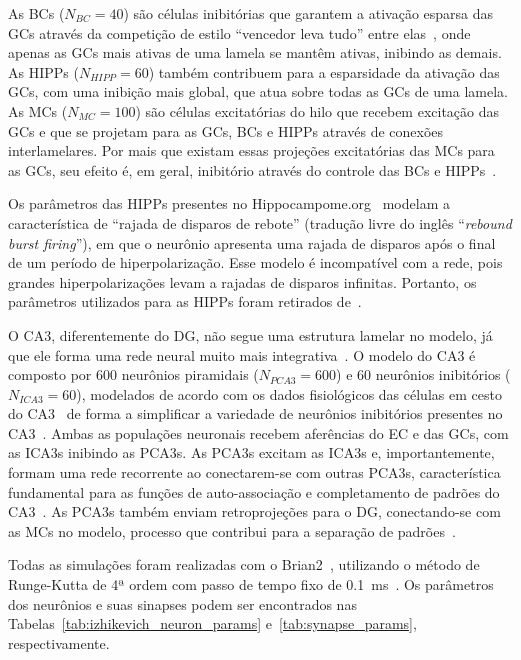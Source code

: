 As BCs ($N_{BC} = 40$) são células inibitórias que garantem a ativação esparsa das GCs através da competição de estilo ``vencedor
leva tudo'' entre elas~\cite{coultripCortical1992,chavlisDendrites2017,kimAdult2024}, onde apenas as GCs mais ativas de uma lamela
se mantêm ativas, inibindo as demais. As HIPPs ($N_{HIPP} = 60$) também contribuem para a esparsidade da ativação das GCs, com uma
inibição mais global, que atua sobre todas as GCs de uma lamela. As MCs ($N_{MC} = 100$) são células excitatórias do hilo que
recebem excitação das GCs e que se projetam para as GCs, BCs e HIPPs através de conexões interlamelares. Por mais que existam
essas projeções excitatórias das MCs para as GCs, seu efeito é, em geral, inibitório através do controle das BCs e
HIPPs~\cite{myersRole2009,scharfmanHilar2013}.

Os parâmetros das HIPPs presentes no Hippocampome.org~\cite{wheelerHippocampomeorg2023} modelam a característica de ``rajada de
disparos de rebote'' (tradução livre do inglês ``\textit{rebound burst firing}''), em que o neurônio apresenta uma rajada de
disparos após o final de um período de hiperpolarização. Esse modelo é incompatível com a rede, pois grandes hiperpolarizações
levam a rajadas de disparos infinitas. Portanto, os parâmetros utilizados para as HIPPs foram retirados
de~.

O CA3, diferentemente do DG, não segue uma estrutura lamelar no modelo, já que ele forma uma rede neural muito mais
integrativa~\cite{pakHippocampal2022, watsonHuman2025}. O modelo do CA3 é composto por 600 neurônios piramidais ($N_{PCA3} = 600$)
e 60 neurônios inibitórios ($N_{ICA3} = 60$), modelados de acordo com os dados fisiológicos das células em cesto do
CA3~\cite{wheelerHippocampomeorg2023} de forma a simplificar a variedade de neurônios inibitórios presentes no
CA3~\cite{kopsickFormation2024}. Ambas as populações neuronais recebem aferências do EC e das GCs, com as ICA3s inibindo as PCA3s.
As PCA3s excitam as ICA3s e, importantemente, formam uma rede recorrente ao conectarem-se com outras PCA3s, característica
fundamental para as funções de auto-associação e completamento de padrões do CA3~\cite{kopsickFormation2024, rollsMechanisms2013}.
As PCA3s também enviam retroprojeções para o DG, conectando-se com as MCs no modelo, processo que contribui para a separação de
padrões~\cite{myersPattern2011}.

Todas as simulações foram realizadas com o Brian2~\cite{stimbergBrian2019a}, utilizando o método de Runge-Kutta de 4ª ordem com
passo de tempo fixo de \SI{0.1}{\milli\second}~\cite{butcherHistory1996}. Os parâmetros dos neurônios e suas sinapses podem ser
encontrados nas Tabelas~\ref{tab:izhikevich_neuron_params} e~\ref{tab:synapse_params}, respectivamente.

